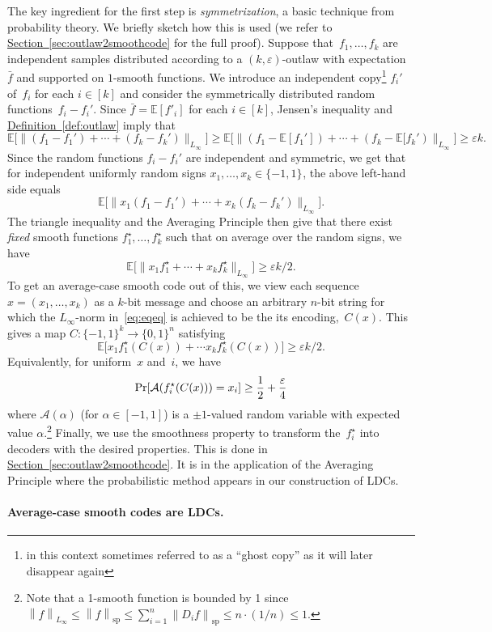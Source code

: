\documentclass[11pt]{article}
\numberwithin{equation}{section}
\theoremstyle{definition}
\theoremstyle{plain}
\newcommand{\expref}[2]{\hyperref[#2]{#1~\ref{#2}}}
\newcommand{\bset}[1]{\{0,1\}^{#1}} %
\newcommand{\pmset}[1]{\{-1,1\}^{#1}} %
\newcommand{\Exp}{{\mathbb{E}}}
\newcommand{\specnorm}[1]{\left\lVert #1 \right\rVert_{\mathrm{sp}}}
\newcommand{\norm}[1]{\left\lVert #1\right\rVert}
\newcommand{\eps}{\varepsilon}
\renewcommand{\Pr}{\mbox{\rm Pr}}
\newcommand{\cA}{{\mathcal A}}
\newcommand{\beq}{\begin{equation}}
\newcommand{\eeq}{\end{equation}}
\newcommand{\beqn}{\begin{equation*}}
\newcommand{\eeqn}{\end{equation*}}
\begin{document}
The key ingredient for the first step is \emph{symmetrization}, a basic technique from probability theory.
We briefly sketch how this is used (we refer to \expref{Section}{sec:outlaw2smoothcode} for the full proof).
Suppose that~$f_1,\dots,f_k$ are independent samples distributed according to a $(k,\eps)$-outlaw with expectation~$\bar f$ and supported on $1$-smooth functions.
We introduce an independent copy\footnote{in this context sometimes referred to as a ``ghost copy'' as it will later disappear again} $f_i'$  of~$f_i$ for each $i\in[k]$ and consider the symmetrically distributed random functions~$f_i - f_i'$.
Since $\bar f = \Exp[f'_i]$ for each $i\in[k]$, Jensen's inequality and \expref{Definition}{def:outlaw} imply that
\beqn
\Exp\big[\|(f_1 - f_1') + \cdots + (f_k - f_k')\|_{L_\infty}\big]
\geq
\Exp\big[\|(f_1 - \Exp[f_1']) + \cdots + (f_k - \Exp[f_k')\|_{L_\infty}\big]
\geq \eps k.
\eeqn
Since the random functions $f_i  -f_i'$ are independent and symmetric, we get that for independent uniformly random signs $x_1,\dots, x_k\in\pmset{}$, the above left-hand side equals
\beqn
\Exp\big[\|x_1(f_1 - f_1') + \cdots + x_k(f_k - f_k')\|_{L_\infty}\big].
\eeqn
The triangle inequality and the Averaging Principle then give that there exist \emph{fixed} smooth functions $f_1^\star,\dots,f_k^\star$ such that on average over the random signs, we have
\beq\label{eq:eqeq}
\Exp\big[ \|x_1f_1^\star + \cdots + x_kf^\star_k\|_{L_\infty}\big] \geq \eps k/2.
\eeq
To get an average-case smooth code out of this, we view each sequence $x = (x_1,\dots,x_k)$ as a $k$-bit message and choose an arbitrary $n$-bit string for which the $L_\infty$-norm in~\eqref{eq:eqeq} is achieved to be the its encoding,~$C(x)$.
This gives a map $C:\pmset{k}\to\bset{n}$ satisfying
\beqn
\Exp\big[x_1f^\star_1(C(x)) + \cdots x_kf^\star_k(C(x))\big] \geq \eps k/2.
\eeqn
Equivalently, for uniform~$x$ and~$i$, we have
\[
  \Pr[\cA(f^\star_i(C(x))) = x_i] \geq \frac12+\frac\eps4
\]
where $\cA(\alpha)$ (for $\alpha\in [-1,1]$) is a $\pm 1$-valued
random variable with expected value $\alpha$.\footnote{Note that a
  1-smooth function is bounded by 1 since
  $\norm{f}_{L_\infty}\le \specnorm{f}\le \sum_{i=1}^n \specnorm{D_if}
  \le n\cdot ({1}/{n}) \le 1$.}  Finally, we use the smoothness
property to transform the~$f_i^\star$ into decoders with the desired
properties.  This is done in \expref{Section}{sec:outlaw2smoothcode}.
It is in the application of the Averaging Principle where the
probabilistic method appears in our construction of LDCs.  \medskip

\paragraph{Average-case smooth codes are LDCs.}
\end{document}
